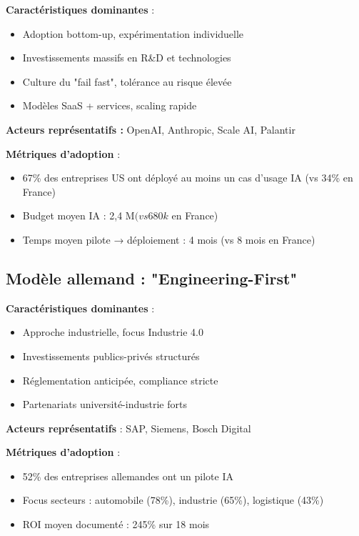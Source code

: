 \textbf{Caractéristiques dominantes} :
\begin{itemize}
    \item Adoption bottom-up, expérimentation individuelle
    \item Investissements massifs en R\&D et technologies
    \item Culture du "fail fast", tolérance au risque élevée
    \item Modèles SaaS + services, scaling rapide
\end{itemize}

\textbf{Acteurs représentatifs :} OpenAI, Anthropic, Scale AI, Palantir

\textbf{Métriques d'adoption} :
\begin{itemize}
    \item 67\% des entreprises US ont déployé au moins un cas d'usage IA (vs 34\% en France)
    \item Budget moyen IA : 2,4 M$ (vs 680 k$ en France)
    \item Temps moyen pilote → déploiement : 4 mois (vs 8 mois en France)
\end{itemize}

\subsection{Modèle allemand : "Engineering-First"}

\textbf{Caractéristiques dominantes} :
\begin{itemize}
    \item Approche industrielle, focus Industrie 4.0
    \item Investissements publics-privés structurés
    \item Réglementation anticipée, compliance stricte
    \item Partenariats université-industrie forts
\end{itemize}

\textbf{Acteurs représentatifs} : SAP, Siemens, Bosch Digital

\textbf{Métriques d'adoption} :
\begin{itemize}
    \item 52\% des entreprises allemandes ont un pilote IA
    \item Focus secteurs : automobile (78\%), industrie (65\%), logistique (43\%)
    \item ROI moyen documenté : 245\% sur 18 mois
\end{itemize}

